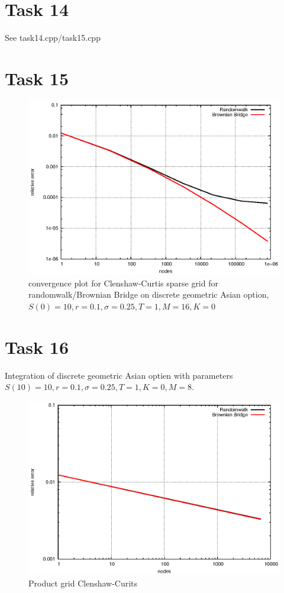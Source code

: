 \documentclass[]{article}
\begin{document}
\section*{Task 14}
See task14.cpp/task15.cpp

\section*{Task 15}
\begin{figure}[!ht]
\includegraphics{task15}
\caption{convergence plot for Clenshaw-Curtis sparse grid for randomwalk/Brownian Bridge on discrete geometric Asian option, $S(0)=10,r=0.1,\sigma=0.25,T=1,M=16,K=0$}
\label{fig:Task15}
\end{figure}
\clearpage

\section*{Task 16}
Integration of discrete geometric Asian optien with parameters $S(10)=10,r=0.1,\sigma=0.25,T=1,K=0,M=8$.

\begin{figure}[!ht]
\includegraphics{task16_ccprod}
\caption{Product grid Clenshaw-Curits}
\label{fig:Task16a}
\end{figure}
\end{document}
